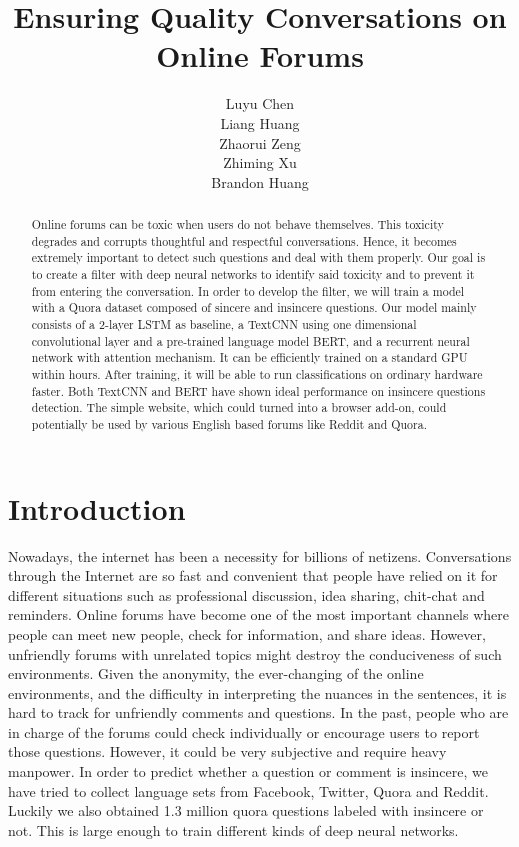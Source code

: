 \documentclass{article}
\title{Ensuring Quality Conversations on Online Forums}
\author{%
  Luyu Chen\\
  \And
  Liang Huang\\
  \And
  Zhaorui Zeng\\
  \And
  Zhiming Xu\\
  \And Brandon Huang
}
\begin{document}

\maketitle

\begin{abstract}
  Online forums can be toxic when users do not behave themselves. This toxicity degrades and corrupts thoughtful and respectful conversations. Hence, it becomes extremely important to detect such questions and deal with them properly. Our goal is to create a filter with deep neural networks to identify said toxicity and to prevent it from entering the conversation. In order to develop the filter, we will train a model with a Quora dataset composed of sincere and insincere questions. Our model mainly consists of a 2-layer LSTM as baseline, a TextCNN using one dimensional convolutional layer and a pre-trained language model BERT, and a recurrent neural network with attention mechanism. It can be efficiently trained on a standard GPU within hours. After training, it will be able to run classifications on ordinary hardware faster. Both TextCNN and BERT have shown ideal performance on insincere questions detection. The simple website, which could turned into a browser add-on, could potentially be used by various English based forums like Reddit and Quora.
\end{abstract}

\section{Introduction}
Nowadays, the internet has been a necessity for billions of netizens. Conversations through the Internet are so fast and convenient that people have relied on it for different situations such as professional discussion, idea sharing, chit-chat and reminders. Online forums have become one of the most important channels where people can meet new people, check for information, and share ideas. However, unfriendly forums with unrelated topics might destroy the conduciveness of such environments. Given the anonymity, the ever-changing of the online environments, and the difficulty in interpreting the nuances in the sentences, it is hard to track for unfriendly comments and questions. In the past, people who are in charge of the forums could check individually or encourage users to report those questions. However, it could be very subjective and require heavy manpower. In order to predict whether a question or comment is insincere, we have tried to collect language sets from Facebook, Twitter, Quora and Reddit. Luckily we also obtained 1.3 million quora questions labeled with insincere or not. This is large enough to train different kinds of deep neural networks. 
\end{document}
